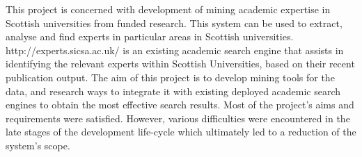 This project is concerned with development of mining academic expertise in Scottish universities from funded research.
This system can be used to extract, analyse and find experts in particular areas in Scottish universities. 
http://experts.sicsa.ac.uk/ is an existing academic search engine 
that assists in identifying the relevant experts within Scottish Universities, based on their recent publication output. 
The aim of this project is to develop mining tools for the data, and research ways to integrate it with existing deployed academic search engines 
to obtain the most effective search results. Most of the project’s aims and requirements were satisfied. However, various difficulties were
encountered in the late stages of the development life-cycle which ultimately led to a reduction of
the system’s scope.
